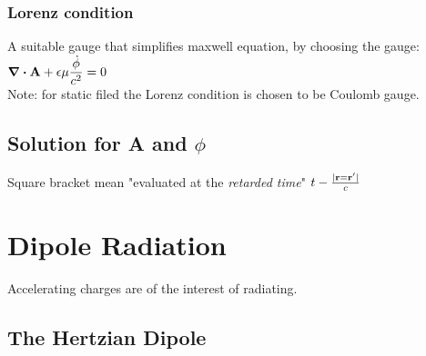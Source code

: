 \documentclass[12pt,a4paper]{article}
\begin{document}
\subsubsection {Lorenz condition}
A suitable gauge that simplifies maxwell equation, by choosing the gauge:
$\div \vb{A}+ \epsilon\mu \dfrac{\dot{\phi}}{c^2} = 0$\\
Note: for static filed the Lorenz condition is chosen to be Coulomb gauge.
\subsection {Solution for A and $\phi$}
Square bracket mean "evaluated at the \textit{retarded time}" $t-\frac{|\vb{r}=\vb{r'}|}{c}$
\section{Dipole Radiation}
Accelerating charges are of the interest of radiating.
\subsection{The Hertzian Dipole}

    
    
\end{document}
